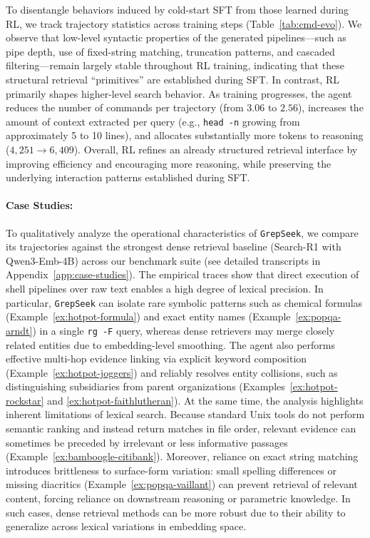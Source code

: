 \documentclass{article} %
\newcommand{\ourmethod}{\texttt{GrepSeek}\xspace}
\begin{document}
To disentangle behaviors induced by cold-start SFT from those learned during RL, we track trajectory statistics across training steps (Table~\ref{tab:cmd-evo}). We observe that low-level syntactic properties of the generated pipelines---such as pipe depth, use of fixed-string matching, truncation patterns, and cascaded filtering---remain largely stable throughout RL training, indicating that these structural retrieval ``primitives'' are established during SFT. In contrast, RL primarily shapes higher-level search behavior. As training progresses, the agent reduces the number of commands per trajectory (from $3.06$ to $2.56$), increases the amount of context extracted per query (e.g., \texttt{head -n} growing from approximately 5 to 10 lines), and allocates substantially more tokens to reasoning ($4{,}251 \rightarrow 6{,}409$). Overall, RL refines an already structured retrieval interface by improving efficiency and encouraging more reasoning, while preserving the underlying interaction patterns established during SFT.



\paragraph{Case Studies:}

To qualitatively analyze the operational characteristics of \ourmethod{}, we compare its trajectories against the strongest dense retrieval baseline (Search-R1 with Qwen3-Emb-4B) across our benchmark suite (see detailed transcripts in Appendix~\ref{app:case-studies}). The empirical traces show that direct execution of shell pipelines over raw text enables a high degree of lexical precision. In particular, \ourmethod{} can isolate rare symbolic patterns such as chemical formulas (Example~\ref{ex:hotpot-formula}) and exact entity names (Example~\ref{ex:popqa-arndt}) in a single \texttt{rg -F} query, whereas dense retrievers may merge closely related entities due to embedding-level smoothing. The agent also performs effective multi-hop evidence linking via explicit keyword composition (Example~\ref{ex:hotpot-joggers}) and reliably resolves entity collisions, such as distinguishing subsidiaries from parent organizations (Examples~\ref{ex:hotpot-rockstar} and \ref{ex:hotpot-faithlutheran}). At the same time, the analysis highlights inherent limitations of lexical search. Because standard Unix tools do not perform semantic ranking and instead return matches in file order, relevant evidence can sometimes be preceded by irrelevant or less informative passages (Example~\ref{ex:bamboogle-citibank}). Moreover, reliance on exact string matching introduces brittleness to surface-form variation: small spelling differences or missing diacritics (Example~\ref{ex:popqa-vaillant}) can prevent retrieval of relevant content, forcing reliance on downstream reasoning or parametric knowledge. In such cases, dense retrieval methods can be more robust due to their ability to generalize across lexical variations in embedding space.
\end{document}
